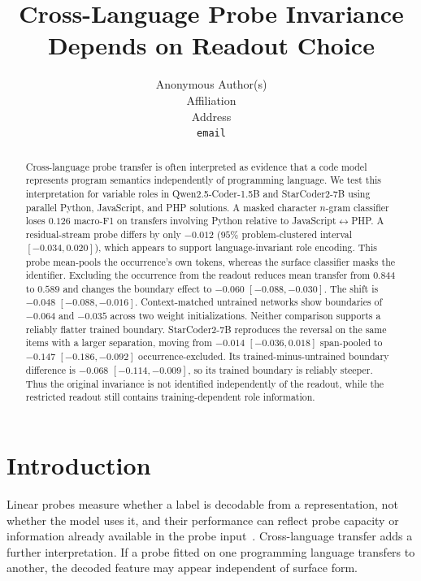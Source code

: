 \documentclass{article}
\title{Cross-Language Probe Invariance Depends on Readout Choice}
\author{%
  Anonymous Author(s) \\
  Affiliation \\
  Address \\
  \texttt{email} \\
}
\begin{document}
\maketitle

\begin{abstract}
Cross-language probe transfer is often interpreted as evidence that a code
model represents program semantics independently of programming language. We
test this interpretation for variable roles in Qwen2.5-Coder-1.5B and
StarCoder2-7B using parallel Python, JavaScript, and PHP solutions. A masked character $n$-gram
classifier loses $0.126$ macro-F1 on transfers involving Python relative to
JavaScript$\leftrightarrow$PHP. A residual-stream probe differs by only
$-0.012$ ($95\%$ problem-clustered interval $[-0.034,0.020]$), which appears
to support language-invariant role encoding. This probe mean-pools the
occurrence's own tokens, whereas the surface classifier masks the identifier.
Excluding the occurrence from the readout reduces mean transfer from $0.844$
to $0.589$ and changes the boundary effect to $-0.060$
$[-0.088,-0.030]$. The shift is $-0.048$ $[-0.088,-0.016]$. Context-matched untrained networks show boundaries of $-0.064$ and $-0.035$
across two weight initializations. Neither comparison supports a reliably
flatter trained boundary. StarCoder2-7B reproduces the reversal on the same items with a
larger separation, moving from $-0.014$ $[-0.036,0.018]$ span-pooled to
$-0.147$ $[-0.186,-0.092]$ occurrence-excluded. Its
trained-minus-untrained boundary difference is $-0.068$
$[-0.114,-0.009]$, so its trained boundary is reliably steeper. Thus the original invariance is not identified
independently of the readout, while the restricted readout still contains
training-dependent role information.
\end{abstract}

\section{Introduction}

Linear probes measure whether a label is decodable from a representation, not
whether the model uses it, and their performance can reflect probe capacity or
information already available in the probe
input~\citep{hewitt2019control,voita2020mdl,ravichander2021probing,
elazar2021amnesic,belinkov2022probing}. Cross-language transfer adds a further
interpretation. If a probe fitted on one programming language transfers to
another, the decoded feature may appear independent of surface form.
\end{document}
